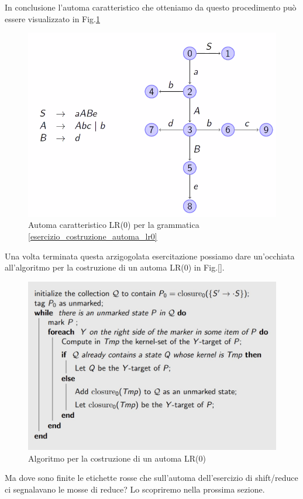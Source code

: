 \documentclass[class=book, crop=false, oneside, 12pt]{standalone}
\begin{document}
In conclusione l'automa caratteristico che otteniamo da questo procedimento può essere visualizzato in Fig.\ref{charateristic-automata_cosntruction}
\begin{figure}
    \centering
    \includegraphics[width=.8\textwidth]{charateristic-automata_cosntruction.png}
    \caption{Automa caratteristico LR(0) per la grammatica \ref{esercizio_costruzione_automa_lr0}}
    \label{charateristic-automata_cosntruction}    
\end{figure}

Una volta terminata questa arzigogolata esercitazione possiamo dare un'occhiata all'algoritmo per la costruzione di un automa LR(0) in Fig.\ref{}.
\begin{figure}
    \centering
    \includegraphics[width=.8\textwidth]{lr0-automata_construction_algorithm.jpg}
    \caption{Algoritmo per la costruzione di un automa LR(0)}
    \label{lr0-automata_construction_algorithm}    
\end{figure}

Ma dove sono finite le etichette rosse che sull'automa dell'esercizio di shift/reduce ci segnalavano le mosse di reduce?
Lo scopriremo nella prossima sezione.
\end{document}
